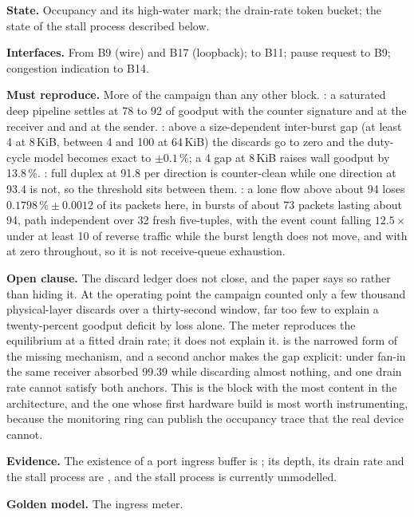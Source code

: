 \textbf{State.} Occupancy and its high-water mark; the drain-rate token bucket;
the state of the stall process described below.

\textbf{Interfaces.} From B9 (wire) and B17 (loopback); to B11; pause request to
B9; congestion indication to B14.

\textbf{Must reproduce.} More of the campaign than any other block.
: a saturated deep pipeline settles at 78 to 92\Gbps{} of goodput with
the counter signature  and  at
the receiver and  and  at the
sender.
: above a size-dependent inter-burst gap (at least 4\uS{} at 8\,KiB,
between 4 and 100\uS{} at 64\,KiB) the discards go to zero and the duty-cycle
model becomes exact to $\pm 0.1\,\%$; a 4\uS{} gap at 8\,KiB raises wall
goodput by 13.8\,\%.
: full duplex at 91.8\Gbps{} per direction is counter-clean while one
direction at 93.4\Gbps{} is not, so the threshold sits between them.
: a lone flow above about 94\Gbps{} loses $0.1798\,\% \pm 0.0012$ of
its packets here, in bursts of about 73 packets lasting about 94\uS{}, path
independent over 32 fresh five-tuples, with the event count falling
$12.5\times$ under at least 10\Gbps{} of reverse traffic while the burst length
does not move, and with  at zero throughout, so it is not
receive-queue exhaustion.

\textbf{Open clause.} The discard ledger does not close, and the paper says so
rather than hiding it. At the  operating point the campaign counted
only a few thousand physical-layer discards over a thirty-second window, far
too few to explain a twenty-percent goodput deficit by loss alone. The meter
reproduces the equilibrium at a fitted drain rate; it does not explain it.
 is the narrowed form of the missing mechanism, and a second anchor
makes the gap explicit: under fan-in the same receiver absorbed 99.39\Gbps{}
while discarding almost nothing, and one drain rate cannot satisfy both
anchors. This is the block with the most \evcal{} content in the architecture,
and the one whose first hardware build is most worth instrumenting, because the
monitoring ring can publish the occupancy trace that the real device cannot.

\textbf{Evidence.} The existence of a port ingress buffer is \evdoc{}; its
depth, its drain rate and the stall process are \evcal{}, and the stall process
is currently unmodelled.

\textbf{Golden model.} The ingress meter.

